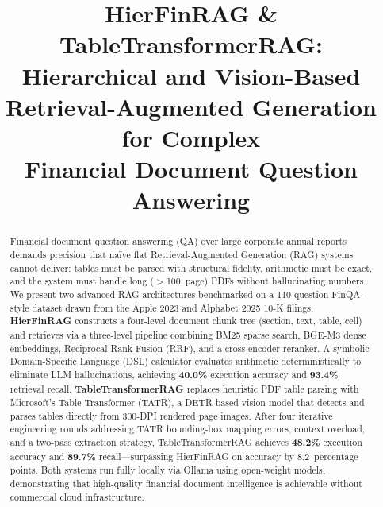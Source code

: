 \documentclass[conference]{IEEEtran}
\begin{document}
\title{HierFinRAG \& TableTransformerRAG: Hierarchical and Vision-Based\\
Retrieval-Augmented Generation for Complex\\
Financial Document Question Answering}

\author{
}

\maketitle

\begin{abstract}
Financial document question answering (QA) over large corporate annual reports
demands precision that na\"{i}ve flat Retrieval-Augmented Generation (RAG)
systems cannot deliver: tables must be parsed with structural fidelity,
arithmetic must be exact, and the system must handle long ($>$100~page) PDFs
without hallucinating numbers. We present two advanced RAG architectures
benchmarked on a 110-question FinQA-style dataset drawn from the Apple 2023 and
Alphabet 2025 10-K filings. \textbf{HierFinRAG} constructs a four-level
document chunk tree (section, text, table, cell) and retrieves via a three-level
pipeline combining BM25 sparse search, BGE-M3 dense embeddings, Reciprocal Rank
Fusion (RRF), and a cross-encoder reranker. A symbolic Domain-Specific Language
(DSL) calculator evaluates arithmetic deterministically to eliminate LLM
hallucinations, achieving \textbf{40.0\%} execution accuracy and
\textbf{93.4\%} retrieval recall. \textbf{TableTransformerRAG} replaces
heuristic PDF table parsing with Microsoft's Table Transformer (TATR), a
DETR-based vision model that detects and parses tables directly from 300-DPI
rendered page images. After four iterative engineering rounds addressing TATR
bounding-box mapping errors, context overload, and a two-pass extraction
strategy, TableTransformerRAG achieves \textbf{48.2\%} execution accuracy and
\textbf{89.7\%} recall---surpassing HierFinRAG on accuracy by 8.2~percentage
points. Both systems run fully locally via Ollama using open-weight models,
demonstrating that high-quality financial document intelligence is achievable
without commercial cloud infrastructure.
\end{abstract}
\end{document}
